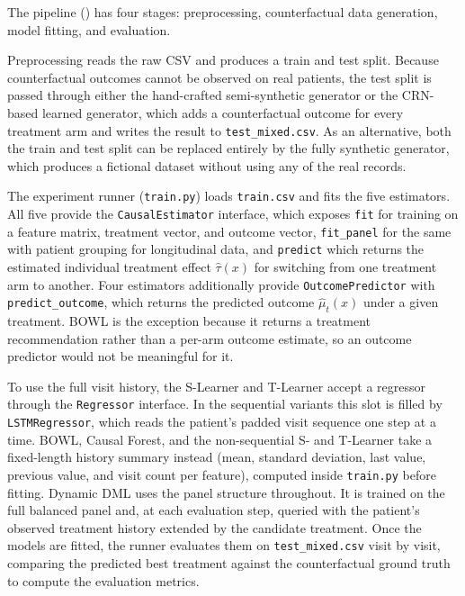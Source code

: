 \documentclass{article}
\begin{document}
The pipeline () has four stages: preprocessing, counterfactual data generation, model fitting, and evaluation.

Preprocessing reads the raw CSV and produces a 
train and test split. Because counterfactual 
outcomes cannot be observed on real patients, the test split is 
passed through either the hand-crafted semi-synthetic generator 
or the CRN-based learned generator, which adds a counterfactual 
outcome for every treatment arm and writes the result to 
\texttt{test\_mixed.csv}. As an alternative, both the train 
and test split can be replaced entirely by the fully synthetic 
generator, which produces a fictional dataset without using 
any of the real records.

The experiment runner (\texttt{train.py}) loads \texttt{train.csv} 
and fits the five estimators. All five provide the 
\texttt{CausalEstimator} interface, which exposes \texttt{fit} for 
training on a feature matrix, treatment vector, and outcome vector, 
\texttt{fit\_panel} for the same with patient grouping for 
longitudinal data, and \texttt{predict} which returns the estimated 
individual treatment effect $\hat{\tau}(x)$ for switching from one 
treatment arm to another. Four estimators additionally provide 
\texttt{OutcomePredictor} with \texttt{predict\_outcome}, which 
returns the predicted outcome $\hat{\mu}_t(x)$ under a given 
treatment. BOWL is the exception because it returns a treatment 
recommendation rather than a per-arm outcome estimate, so an 
outcome predictor would not be meaningful for it.

To use the full visit history, the S-Learner and T-Learner accept 
a regressor through the \texttt{Regressor} interface. In the 
sequential variants this slot is filled by \texttt{LSTMRegressor}, 
which reads the patient's padded visit sequence one step at a 
time. BOWL, Causal Forest, and the non-sequential S- and T-Learner 
take a fixed-length history summary instead (mean, standard 
deviation, last value, previous value, and visit count per 
feature), computed inside \texttt{train.py} before fitting. 
Dynamic DML uses the panel structure throughout. It is trained on 
the full balanced panel and, at each evaluation step, queried with 
the patient's observed treatment history extended by the candidate 
treatment. Once the models are fitted, the runner evaluates them 
on \texttt{test\_mixed.csv} visit by visit, comparing the predicted 
best treatment against the counterfactual ground truth to compute 
the evaluation metrics.
\end{document}
